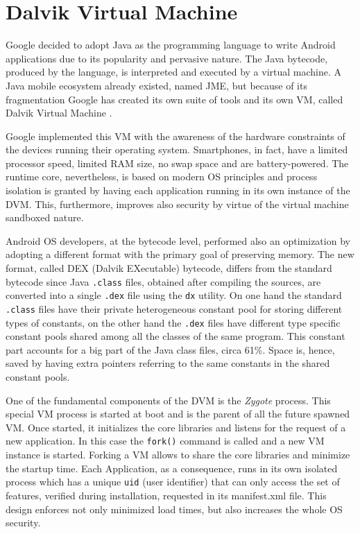 \section{Dalvik Virtual Machine}
\label{sec:bg_dalvik}

Google decided to adopt Java as the programming language to write
Android applications due to its popularity and pervasive nature. The
Java bytecode, produced by the language, is interpreted and executed
by a virtual machine. A Java mobile ecosystem already existed, named
JME, but because of its fragmentation Google has created its own suite
of tools and its own VM, called Dalvik Virtual Machine \cite{ref14}.

Google implemented this VM with the awareness of the hardware
constraints of the devices running their operating
system. Smartphones, in fact, have a limited processor speed, limited
RAM size, no swap space and are battery-powered. The runtime core,
nevertheless, is based on modern OS principles and process isolation
is granted by having each application running in its own instance of
the DVM. This, furthermore, improves also security by virtue of the
virtual machine sandboxed nature.

Android OS developers, at the bytecode level, performed also an
optimization by adopting a different format with the primary goal of
preserving memory. The new format, called DEX (Dalvik EXecutable)
bytecode, differs from the standard bytecode since Java \texttt{.class} files,
obtained after compiling the sources, are converted into a single \texttt{.dex}
file using the \texttt{dx} utility. On one hand the standard \texttt{.class} files
have their private heterogeneous constant pool for storing different
types of constants, on the other hand the \texttt{.dex} files have different type
specific constant pools shared among all the classes of the same
program. This constant part accounts for a big part of the Java class
files, circa 61\%. Space is, hence, saved by having extra pointers
referring to the same constants in the shared constant pools.

One of the fundamental components of the DVM is the \emph{Zygote}
process. This special VM process is started at boot and is the parent
of all the future spawned VM. Once started, it initializes the core
libraries and listens for the request of a new application. In this
case the \texttt{fork()} command is called and a new VM instance is
started. Forking a VM allows to share the core libraries and minimize
the startup time. Each Application, as a consequence, runs in its own
isolated process which has a unique \texttt{uid} (user identifier) that can
only access the set of features, verified during installation,
requested in its manifest.xml file. This design enforces not only
minimized load times, but also increases the whole OS security.

